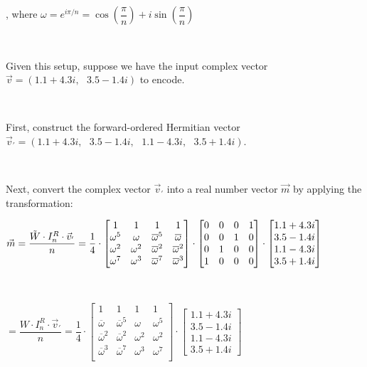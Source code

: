 , where $\omega = e^{i\pi/n} = \cos \left(\dfrac{\pi}{n}\right) + i\sin \left(\dfrac{\pi}{n}\right)$

$ $


Given this setup, suppose we have the input complex vector $\vec{v} = (1.1 + 4.3i, \text{ } 3.5 - 1.4i)$ to encode. 

$ $

First, construct the forward-ordered Hermitian vector $\vec{v}_{'} = (1.1 + 4.3i, \text{ } 3.5 - 1.4i, \text{ } 1.1 - 4.3i, \text{ } 3.5 + 1.4i)$. 

$ $

Next, convert the complex vector $\vec{v}_{'}$ into a real number vector $\vec{m}$ by applying the transformation: 


$\vec{m} = \dfrac{\tilde{W} \cdot I_n^R \cdot \vec{v}_{'}}{n} = \dfrac{1}{4} \cdot \begin{bmatrix}
1 & 1 & 1 & 1\\
\omega^5 & \omega & \overline{\omega}^5 & \overline{\omega}\\
\omega^2 & \omega^2 & \overline{\omega}^2 & \overline{\omega}^2\\
\omega^7 & \omega^3 & \overline{\omega}^7 & \overline{\omega}^3\\
\end{bmatrix} \cdot 
\begin{bmatrix}
0 & 0 & 0 & 1 \\
0 & 0 & 1 & 0 \\
0 & 1 & 0 & 0 \\
1 & 0 & 0 & 0 
\end{bmatrix}
\cdot
\begin{bmatrix} 1.1 + 4.3i\\3.5 - 1.4i\\1.1 - 4.3i\\3.5 + 1.4i \end{bmatrix}$

$ $

$= \dfrac{W \cdot I_n^R \cdot \vec{v}_{'}}{n} = \dfrac{1}{4} \cdot\begin{bmatrix}
1 & 1 & 1 & 1\\
\overline{\omega} & \overline{\omega}^5 & \omega  & \omega^5\\
\overline{\omega}^2 & \overline{\omega}^2 & \omega^2 & \omega^2\\
\overline{\omega}^3 & \overline{\omega}^7 & \omega^3 & \omega^7\\
\end{bmatrix} 
\cdot
\begin{bmatrix} 1.1 + 4.3i\\3.5 - 1.4i\\1.1 - 4.3i\\3.5 + 1.4i \end{bmatrix}$

